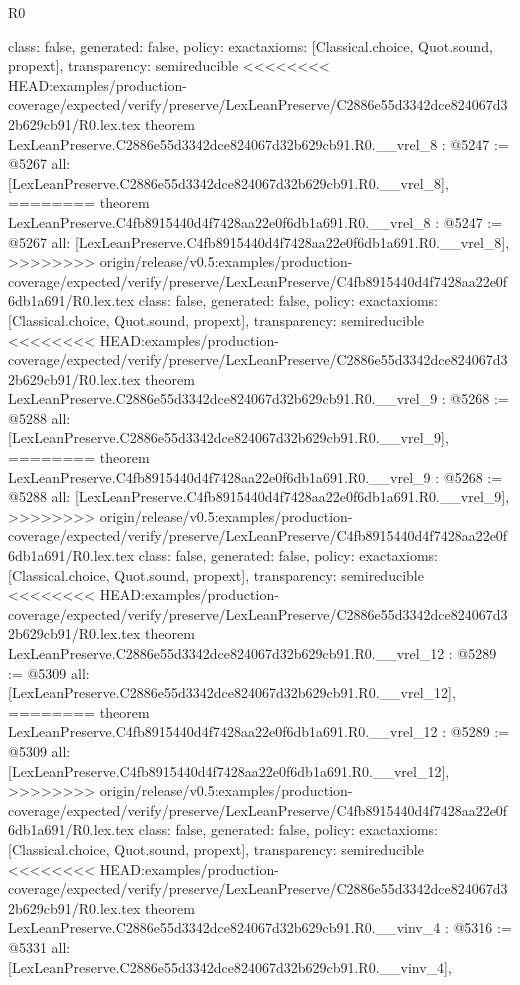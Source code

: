 \begin{lexlean}{R0}
\begin{coremodule}
{{{{{{{{{{{{{{{{{{{{{{{{{{{{{{{{{{{{{{{{{{{{{{{{{{{{{{{{{{{{{{{{{{{{{{{  class: false,
  generated: false,
  policy: exact{axioms: [Classical.choice, Quot.sound, propext]},
  transparency: semireducible
}
<<<<<<<< HEAD:examples/production-coverage/expected/verify/preserve/LexLeanPreserve/C2886e55d3342dce824067d32b629cb91/R0.lex.tex
theorem LexLeanPreserve.C2886e55d3342dce824067d32b629cb91.R0.__vrel_8 : @5247 := @5267 {
  all: [LexLeanPreserve.C2886e55d3342dce824067d32b629cb91.R0.__vrel_8],
========
theorem LexLeanPreserve.C4fb8915440d4f7428aa22e0f6db1a691.R0.__vrel_8 : @5247 := @5267 {
  all: [LexLeanPreserve.C4fb8915440d4f7428aa22e0f6db1a691.R0.__vrel_8],
>>>>>>>> origin/release/v0.5:examples/production-coverage/expected/verify/preserve/LexLeanPreserve/C4fb8915440d4f7428aa22e0f6db1a691/R0.lex.tex
  class: false,
  generated: false,
  policy: exact{axioms: [Classical.choice, Quot.sound, propext]},
  transparency: semireducible
}
<<<<<<<< HEAD:examples/production-coverage/expected/verify/preserve/LexLeanPreserve/C2886e55d3342dce824067d32b629cb91/R0.lex.tex
theorem LexLeanPreserve.C2886e55d3342dce824067d32b629cb91.R0.__vrel_9 : @5268 := @5288 {
  all: [LexLeanPreserve.C2886e55d3342dce824067d32b629cb91.R0.__vrel_9],
========
theorem LexLeanPreserve.C4fb8915440d4f7428aa22e0f6db1a691.R0.__vrel_9 : @5268 := @5288 {
  all: [LexLeanPreserve.C4fb8915440d4f7428aa22e0f6db1a691.R0.__vrel_9],
>>>>>>>> origin/release/v0.5:examples/production-coverage/expected/verify/preserve/LexLeanPreserve/C4fb8915440d4f7428aa22e0f6db1a691/R0.lex.tex
  class: false,
  generated: false,
  policy: exact{axioms: [Classical.choice, Quot.sound, propext]},
  transparency: semireducible
}
<<<<<<<< HEAD:examples/production-coverage/expected/verify/preserve/LexLeanPreserve/C2886e55d3342dce824067d32b629cb91/R0.lex.tex
theorem LexLeanPreserve.C2886e55d3342dce824067d32b629cb91.R0.__vrel_12 : @5289 := @5309 {
  all: [LexLeanPreserve.C2886e55d3342dce824067d32b629cb91.R0.__vrel_12],
========
theorem LexLeanPreserve.C4fb8915440d4f7428aa22e0f6db1a691.R0.__vrel_12 : @5289 := @5309 {
  all: [LexLeanPreserve.C4fb8915440d4f7428aa22e0f6db1a691.R0.__vrel_12],
>>>>>>>> origin/release/v0.5:examples/production-coverage/expected/verify/preserve/LexLeanPreserve/C4fb8915440d4f7428aa22e0f6db1a691/R0.lex.tex
  class: false,
  generated: false,
  policy: exact{axioms: [Classical.choice, Quot.sound, propext]},
  transparency: semireducible
}
<<<<<<<< HEAD:examples/production-coverage/expected/verify/preserve/LexLeanPreserve/C2886e55d3342dce824067d32b629cb91/R0.lex.tex
theorem LexLeanPreserve.C2886e55d3342dce824067d32b629cb91.R0.__vinv_4 : @5316 := @5331 {
  all: [LexLeanPreserve.C2886e55d3342dce824067d32b629cb91.R0.__vinv_4],
}}}}}}}}}}}}}}}}}}}}}}}}}}}}}}}}}}}}}}}}}}}}}}}}}}}}}}}}}}}}}}}}}}}}}}}}}}
\end{coremodule}
\end{lexlean}
